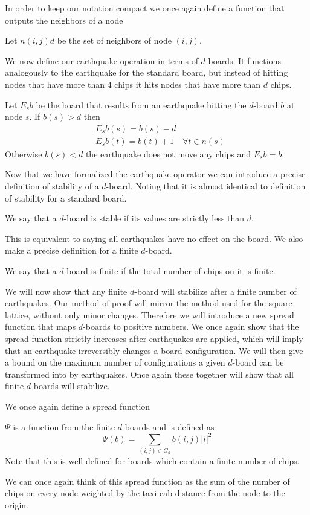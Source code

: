 \documentclass[runningheads,a4paper]{llncs}
\begin{document}
In order to keep our notation compact we once again define a function that outputs the neighbors of a node
\begin{definition} 
Let $n(i,j)d$ be the set of neighbors of node $(i,j)$.
\end{definition}

We now define our earthquake operation in terms of $d$-boards. It functions analogously to the earthquake for the standard board, but instead of hitting nodes that have more than 4 chips it hits nodes that have more than $d$ chips. 
\begin{definition}
Let $E_s b$ be the board that results from an earthquake hitting the $d$-board $b$ at node $s$. If $b(s)>d$ then 
\begin{align*}
&E_s b(s) = b(s)- d \\
&E_s b(t) = b(t) +1 \quad \forall t \in n(s)
\end{align*}
Otherwise $b(s)<d$ the earthquake does not move any chips and $E_s b=b$.
\end{definition}

Now that we have formalized the earthquake operator we can introduce a precise definition of stability of a $d$-board. Noting that it is almost identical to definition of stability for a standard board. 
\begin{definition}
We say that a $d$-board is stable if its values are strictly less than $d$.
\end{definition}
This is equivalent to saying all earthquakes have no effect on the board. We also make a precise definition for a finite $d$-board.
\begin{definition} 
We say that a $d$-board is finite if the total number of chips on it is finite.
\end{definition}

We will now show that any finite $d$-board will stabilize after a finite number of earthquakes. Our method of proof will mirror the method used for the square lattice, without only minor changes.  Therefore we will introduce a new spread function that maps $d$-boards to positive numbers. We once again show that the spread function strictly increases after earthquakes are applied, which will imply that an earthquake irreversibly changes a board configuration. We will then give a bound on the maximum number of configurations a given $d$-board can be transformed into by earthquakes. Once again these together will show that all finite $d$-boards will stabilize.

We once again define a spread function 
\begin{definition}
$\Psi$ is a function from the finite $d$-boards and is defined as
\begin{equation*}
\Psi(b) = \sum_{(i,j) \in G_d} b(i,j) |i|^2
\end{equation*}
Note that this is well defined for boards which contain a finite number of chips. 
\end{definition} 
We can once again think of this spread function as the sum of the number of chips on every node weighted by the taxi-cab distance from the node to the origin. 
\end{document}

